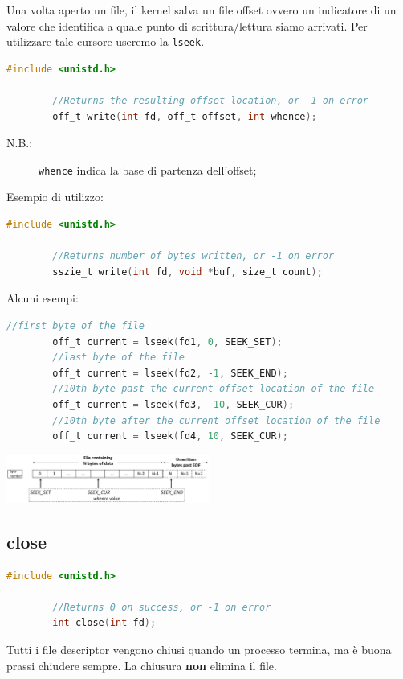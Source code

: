 \documentclass[a4paper, 12pt]{book}
\begin{document}
    Una volta aperto un file, il kernel salva un file offset
    ovvero un indicatore di un valore che identifica a quale punto 
    di scrittura/lettura siamo arrivati. Per utilizzare tale 
    cursore useremo la \verb|lseek|.
    \begin{lstlisting}[language=C]
        #include <unistd.h>

        //Returns the resulting offset location, or -1 on error
        off_t write(int fd, off_t offset, int whence);
    \end{lstlisting}
    \begin{description}
        \item[N.B.:] \verb|whence| indica la base di partenza dell'offset; 
    \end{description}
    Esempio di utilizzo:
    \begin{lstlisting}[language=C]
        #include <unistd.h>

        //Returns number of bytes written, or -1 on error
        sszie_t write(int fd, void *buf, size_t count);
    \end{lstlisting}
    Alcuni esempi:
    \begin{lstlisting}[language=C]
        //first byte of the file
        off_t current = lseek(fd1, 0, SEEK_SET);
        //last byte of the file
        off_t current = lseek(fd2, -1, SEEK_END);
        //10th byte past the current offset location of the file
        off_t current = lseek(fd3, -10, SEEK_CUR);
        //10th byte after the current offset location of the file
        off_t current = lseek(fd4, 10, SEEK_CUR);
    \end{lstlisting}
    \begin{center}
        \includegraphics[width=0.5\textwidth]{lseek.png}
    \end{center}

    \subsection{close}

    \begin{lstlisting}[language=C]
        #include <unistd.h>

        //Returns 0 on success, or -1 on error
        int close(int fd);
    \end{lstlisting}
    Tutti i file descriptor vengono chiusi quando un processo 
    termina, ma è buona prassi chiudere sempre. La chiusura 
    \textbf{non} elimina il file. 
\end{document}
